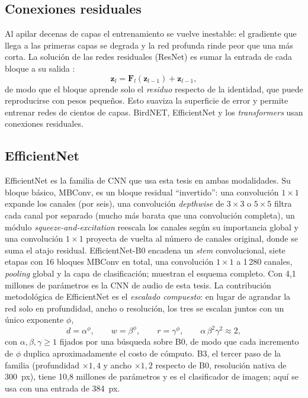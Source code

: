 \subsection{Conexiones residuales}

Al apilar decenas de capas el entrenamiento se vuelve inestable: el
gradiente que llega a las primeras capas se degrada y la red profunda rinde
peor que una más corta. La solución de las redes residuales (ResNet) es
sumar la entrada de cada bloque a su salida \citep{he2016resnet}:
\begin{equation}
  \mathbf{z}_l = \mathbf{F}_l(\mathbf{z}_{l-1}) + \mathbf{z}_{l-1},
  \label{eq:residual}
\end{equation}
de modo que el bloque aprende solo el \emph{residuo} respecto de la
identidad, que puede reproducirse con pesos pequeños. Esto suaviza la
superficie de error y permite entrenar redes de cientos de capas. BirdNET,
EfficientNet y los
\textit{transformers} usan conexiones residuales.

\subsection{EfficientNet}

EfficientNet \citep{tan2019efficientnet} es la familia de CNN que usa esta
tesis en ambas modalidades. Su bloque básico, MBConv, es un bloque residual ``invertido'': una
convolución $1 \times 1$ expande los canales (por seis), una convolución
\textit{depthwise} de $3 \times 3$ o $5 \times 5$ filtra cada canal por
separado (mucho más barata que una convolución completa), un módulo
\textit{squeeze-and-excitation} reescala los canales según su importancia
global y una convolución $1 \times 1$ proyecta de vuelta al número de
canales original, donde se suma el atajo residual. EfficientNet-B0 encadena
un \textit{stem} convolucional, siete etapas con 16 bloques MBConv en
total, una convolución $1 \times 1$ a 1\,280 canales, \textit{pooling}
global y la capa de clasificación; \citet{tan2019efficientnet}
muestran el esquema completo. Con 4,1 millones de
parámetros es la CNN de audio de esta tesis. La contribución metodológica de
EfficientNet es el \emph{escalado compuesto}: en lugar de agrandar la red
solo en profundidad, ancho o resolución, los tres se escalan juntos con un
único exponente $\phi$,
\begin{equation}
  d = \alpha^{\phi}, \qquad w = \beta^{\phi}, \qquad r = \gamma^{\phi},
  \qquad \alpha\,\beta^{2}\gamma^{2} \approx 2,
  \label{eq:compound}
\end{equation}
con $\alpha, \beta, \gamma \ge 1$ fijados por una búsqueda sobre B0, de modo que
cada incremento de $\phi$ duplica aproximadamente el costo de cómputo. B3,
el tercer paso de la familia (profundidad $\times 1{,}4$ y ancho
$\times 1{,}2$ respecto de B0, resolución nativa de \SI{300}{px}), tiene
10,8 millones de parámetros y es el clasificador de imagen; aquí se usa con
una entrada de \SI{384}{px}.


